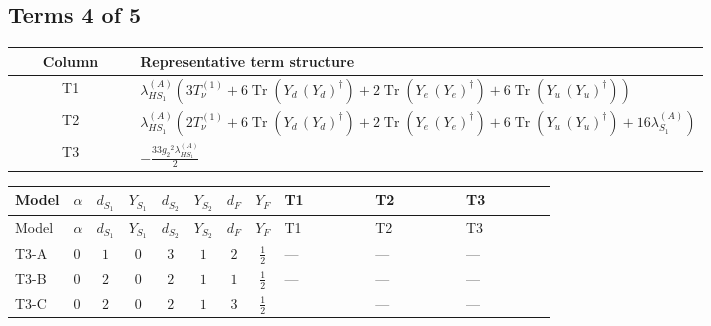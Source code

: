 \documentclass[8pt]{article}
\begin{document}
\begin{landscape}
\subsection*{Terms 4 of 5}
\begin{center}
\begin{tabular}{@{}c >{\raggedright\arraybackslash}p{0.82\linewidth}@{}}
\toprule
Column & Representative term structure \\
\midrule
T1 & \(\displaystyle {\lambda_{HS_1}^{(A)}} (3 T_{\nu}^{(1)}+6 \operatorname{Tr}\!\left({Y_d}\,\left({Y_d}\right)^{\dagger}\right)+2 \operatorname{Tr}\!\left({Y_e}\,\left({Y_e}\right)^{\dagger}\right)+6 \operatorname{Tr}\!\left({Y_u}\,\left({Y_u}\right)^{\dagger}\right))\) \\
\midrule
T2 & \(\displaystyle {\lambda_{HS_1}^{(A)}} (2 T_{\nu}^{(1)}+6 \operatorname{Tr}\!\left({Y_d}\,\left({Y_d}\right)^{\dagger}\right)+2 \operatorname{Tr}\!\left({Y_e}\,\left({Y_e}\right)^{\dagger}\right)+6 \operatorname{Tr}\!\left({Y_u}\,\left({Y_u}\right)^{\dagger}\right)+16 {\lambda_{S_1}^{(A)}})\) \\
\midrule
T3 & \(\displaystyle -\frac{33 {g_2}^2 {\lambda_{HS_1}^{(A)}}}{2}\) \\
\midrule
\bottomrule
\end{tabular}
\end{center}
\smallskip
\tiny
\begin{longtable}{@{}llcccccc >{\raggedright\arraybackslash}p{0.21\linewidth} >{\raggedright\arraybackslash}p{0.21\linewidth} >{\raggedright\arraybackslash}p{0.21\linewidth}@{}}
\toprule
Model & $\alpha$ & $d_{S_1}$ & $Y_{S_1}$ & $d_{S_2}$ & $Y_{S_2}$ & $d_F$ & $Y_F$ & T1 & T2 & T3 \\
\midrule
\endfirsthead
\toprule
Model & $\alpha$ & $d_{S_1}$ & $Y_{S_1}$ & $d_{S_2}$ & $Y_{S_2}$ & $d_F$ & $Y_F$ & T1 & T2 & T3 \\
\midrule
\endhead
T3-A & $0$ & $1$ & $0$ & $3$ & $1$ & $2$ & $\frac{1}{2}$ & --- & --- & --- \\
\midrule
T3-B & $0$ & $2$ & $0$ & $2$ & $1$ & $1$ & $\frac{1}{2}$ & --- & --- & --- \\
\midrule
T3-C & $0$ & $2$ & $0$ & $2$ & $1$ & $3$ & $\frac{1}{2}$ & \scriptsize\adjustbox{max width=\linewidth}{$\begin{gathered} {\lambda_{HS_1}^{(A)}} (3 T_{\nu}^{(1)}+6 \operatorname{Tr}\!\left({Y_d}\,\left({Y_d}\right)^{\dagger}\right)+2 \operatorname{Tr}\!\left({Y_e}\,\left({Y_e}\right)^{\dagger}\right)+6 \operatorname{Tr}\!\left({Y_u}\,\left({Y_u}\right)^{\dagger}\right))\end{gathered}$} & --- & --- \\

\end{longtable}
\end{landscape}
\end{document}
